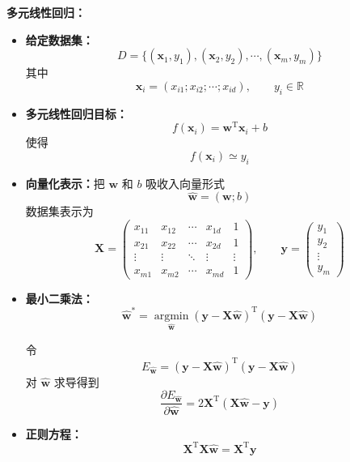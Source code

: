 \documentclass[../main.tex]{subfiles}
\begin{document}
\begin{enumerate}
{    \item \textbf{多元线性回归：}
    \begin{itemize}
        \item \textbf{给定数据集：}
        $$
        D=\{(\mathbf{x}_1,y_1),(\mathbf{x}_2,y_2),\cdots,(\mathbf{x}_m,y_m)\}
        $$
        其中
        $$
        \mathbf{x}_i=(x_{i1};x_{i2};\cdots;x_{id}),\qquad y_i\in\mathbb{R}
        $$
        
        \item \textbf{多元线性回归目标：}
        $$
        f(\mathbf{x}_i)=\mathbf{w}^{\mathrm{T}}\mathbf{x}_i+b
        $$
        使得
        $$
        f(\mathbf{x}_i)\simeq y_i
        $$
        
        \item \textbf{向量化表示：}把 $\mathbf{w}$ 和 $b$ 吸收入向量形式
        $$
        \hat{\mathbf{w}}=(\mathbf{w};b)
        $$
        数据集表示为
        $$
        \mathbf{X}=
        \begin{pmatrix}
        x_{11} & x_{12} & \cdots & x_{1d} & 1 \\
        x_{21} & x_{22} & \cdots & x_{2d} & 1 \\
        \vdots & \vdots & \ddots & \vdots & \vdots \\
        x_{m1} & x_{m2} & \cdots & x_{md} & 1
        \end{pmatrix},
        \qquad
        \mathbf{y}=
        \begin{pmatrix}
        y_1\\
        y_2\\
        \vdots\\
        y_m
        \end{pmatrix}
        $$
        
        \item \textbf{最小二乘法：}
        $$
        \hat{\mathbf{w}}^{*}
        =\underset{\hat{\mathbf{w}}}{\operatorname*{argmin}}
        (\mathbf{y}-\mathbf{X}\hat{\mathbf{w}})^{\mathrm{T}}(\mathbf{y}-\mathbf{X}\hat{\mathbf{w}})
        $$
        
        令
        $$
        E_{\hat{\mathbf{w}}}=(\mathbf{y}-\mathbf{X}\hat{\mathbf{w}})^{\mathrm{T}}(\mathbf{y}-\mathbf{X}\hat{\mathbf{w}})
        $$
        对 $\hat{\mathbf{w}}$ 求导得到
        $$
        \frac{\partial E_{\hat{\mathbf{w}}}}{\partial \hat{\mathbf{w}}}
        =2\mathbf{X}^{\mathrm{T}}(\mathbf{X}\hat{\mathbf{w}}-\mathbf{y})
        $$
        
        \item \textbf{正则方程：}
        $$
        \mathbf{X}^{\mathrm{T}}\mathbf{X}\hat{\mathbf{w}}=\mathbf{X}^{\mathrm{T}}\mathbf{y}
        $$
        

\end{itemize}}
\end{enumerate}
\end{document}
